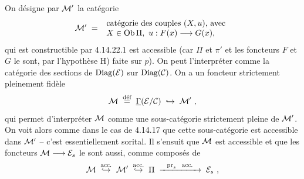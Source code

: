 
On désigne par $\mathcal{M}'$ la catégorie
\[
\mathcal{M}' \;=\;
\begin{array}{l}
\text{catégorie des couples } (X,u)\text{, avec}\\
X \in \operatorname{Ob}\Pi,\ u : F(x) \longrightarrow G(x),
\end{array}
\] %
qui est constructible par 4.14.22.1 est accessible (car $\Pi$ et $\pi'$ et les foncteurs $F$ et $G$ le sont, par l'hypothèse H) faite sur $p$). On peut l'interpréter comme la catégorie des sections %
de $\mathrm{Diag}(\mathcal{E})$ sur $\mathrm{Diag}(\mathcal{C})$. On a un foncteur strictement pleinement fidèle
\[
\cM \;\defeq\; \underline{\Gamma}(\cE/\cC) \;\hookrightarrow\; \cM'\ ,
\]
qui permet d'interpréter $\mathcal{M}$ comme une sous-catégorie strictement pleine de $\mathcal{M}'$. On voit alors comme dans le cas de 4.14.17 que cette sous-catégorie est accessible dans $\mathcal{M}'$ -- c'est essentiellement sorital. Il s'ensuit que $\mathcal{M}$ est accessible et que les foncteurs $\mathcal{M} \longrightarrow \mathcal{E}_s$ le sont aussi, comme composés de
\[
\mathcal{M} \;\overset{\text{\upshape acc.}}{\hookrightarrow}\; \mathcal{M}' \;\overset{\text{\upshape acc.}}{\hookrightarrow}\; \Pi \;\xrightarrow{\ \ \mathrm{pr}_s\ \ \text{\upshape acc.}\ \ }\; \mathcal{E}_s\ ,
\]

